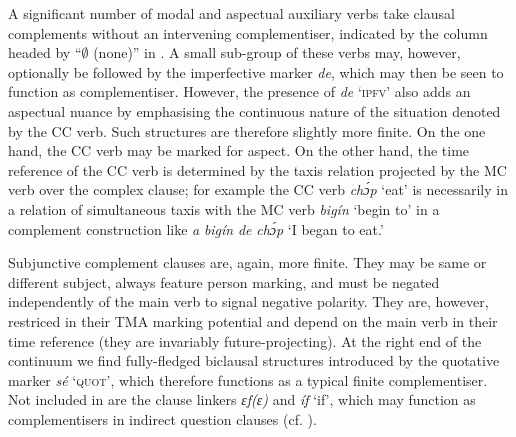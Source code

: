 A significant number of modal and aspectual auxiliary verbs take clausal complements without an intervening complementiser, indicated by the column headed by “${\emptyset}$ (none)” in . A small sub-group of these verbs may, however, optionally be followed by the imperfective marker \textit{de}, which may then be seen to function as complementiser. However, the presence of \textit{de} \textsc{‘ipfv’} also adds an aspectual nuance by emphasising the continuous nature of the situation denoted by the CC verb. Such structures are therefore slightly more finite. On the one hand, the CC verb may be marked for aspect. On the other hand, the time reference of  the CC verb is determined by the taxis relation projected by the MC verb over the complex clause; for example the CC verb \textit{chɔ́p} ‘eat’ is necessarily in a relation of simultaneous taxis with the MC verb \textit{bigín} ‘begin to’ in a complement construction like \textit{a} \textit{bigín} \textit{de} \textit{chɔ́p} ‘I began to eat.’



Subjunctive complement clauses are, again, more finite. They may be same or different subject, always feature person marking, and must be negated independently of the main verb to signal negative polarity. They are, however, restriced in their TMA marking potential and depend on the main verb in their time reference (they are invariably future-projecting). At the right end of the continuum we find fully-fledged biclausal structures introduced by the quotative marker \textit{sé} ‘\textsc{quot}’, which therefore functions as a typical finite complementiser. Not included in  are the clause linkers \textit{ɛf(ɛ)} and\textit{ íf} ‘if’, which may function as complementisers in indirect question clauses (cf. ).


